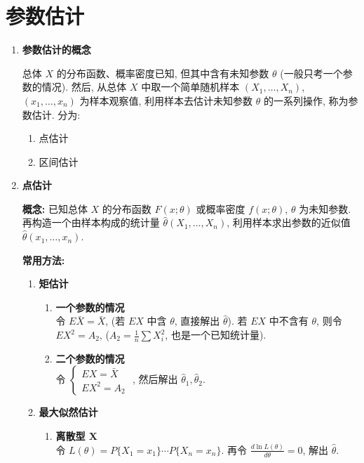 \documentclass[padp]{ExBook}
\begin{document}
\section{参数估计}
 \begin{enumerate}
    \item \textbf{参数估计的概念}
    
    总体 $X$ 的分布函数、概率密度已知, 但其中含有未知参数 $\theta$ (一般只考一个参数的情况).
    然后, 从总体 $X$ 中取一个简单随机样本 $(X_1, \dots, X_n)$, $(x_1, \dots, x_n)$ 为样本观察值, 利用样本去估计未知参数 $\theta$ 的一系列操作, 称为参数估计.
    分为:
    \begin{enumerate}
        \item 点估计
        \item 区间估计 
    \end{enumerate}

    \item \textbf{点估计}
    
    \textbf{概念:} 已知总体 $X$ 的分布函数 $F(x; \theta)$ 或概率密度 $f(x; \theta)$, $\theta$ 为未知参数. 再构造一个由样本构成的统计量 $\hat{\theta}(X_1, \dots, X_n)$, 利用样本求出参数的近似值 $\hat{\theta}(x_1, \dots, x_n)$.

    \textbf{常用方法:}
    \begin{enumerate}
        \item \textbf{矩估计}
        \begin{enumerate}[label=\roman*.]
            \item \textbf{一个参数的情况} \\
            令 $E\bar{X} = \bar{X}$, (若 $EX$ 中含 $\theta$, 直接解出 $\hat{\theta}$).
            若 $EX$ 中不含有 $\theta$,
            则令 $EX^2 = A_2$, ($A_2=\frac{1}{n}\sum X_i^2$, 也是一个已知统计量).
            
            \item \textbf{二个参数的情况} \\
            令
            $\begin{cases}
                EX = \bar{X} \\
                EX^2 = A_2
            \end{cases}$
            , 然后解出 $\hat{\theta}_1, \hat{\theta}_2$.
        \end{enumerate}

        \item \textbf{最大似然估计}
        \begin{enumerate}[label=\roman*.]
            \item \textbf{离散型 X} \\
            令 $L(\theta) = P\{X_1=x_1\} \cdots P\{X_n=x_n\}$.
            再令 $\frac{d \ln L(\theta)}{d\theta} = 0$, 解出 $\hat{\theta}$.
            

\end{enumerate}
\end{enumerate}
\end{enumerate}
\end{document}
